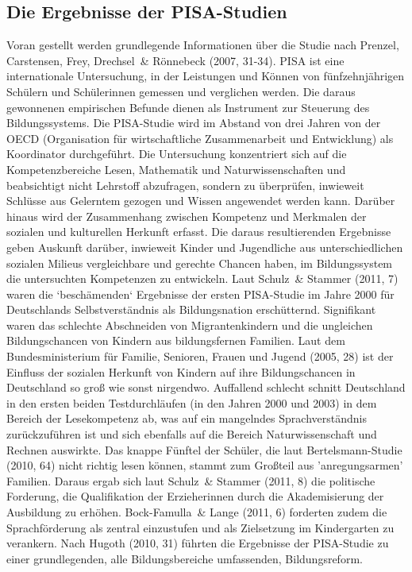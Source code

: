 \subsection{Die Ergebnisse der PISA-Studien}
Voran gestellt werden grundlegende Informationen über die Studie nach Prenzel, Carstensen, Frey, Drechsel~\& Rönnebeck (2007, 31-34). PISA ist eine internationale Untersuchung, in der Leistungen und Können von fünfzehnjährigen Schülern und Schülerinnen gemessen und verglichen werden. Die daraus gewonnenen empirischen Befunde dienen als Instrument zur Steuerung des Bildungssystems. Die PISA-Studie wird im Abstand von drei Jahren von der OECD (Organisation für wirtschaftliche Zusammenarbeit und Entwicklung) als Koordinator durchgeführt. Die Untersuchung konzentriert sich auf die Kompetenzbereiche Lesen, Mathematik und Naturwissenschaften und beabsichtigt nicht Lehrstoff abzufragen, sondern zu überprüfen, inwieweit Schlüsse aus Gelerntem gezogen und Wissen angewendet werden kann. Darüber hinaus wird der Zusammenhang zwischen Kompetenz und Merkmalen der sozialen und kulturellen Herkunft erfasst. Die daraus resultierenden Ergebnisse geben Auskunft darüber, inwieweit Kinder und Jugendliche aus unterschiedlichen sozialen Milieus vergleichbare und gerechte Chancen haben, im Bildungssystem die untersuchten Kompetenzen zu entwickeln. 
Laut Schulz~\& Stammer (2011, 7) waren die ‘beschämenden‘ Ergebnisse der ersten PISA-Studie im Jahre 2000 für Deutschlands Selbstverständnis als Bildungsnation erschütternd. Signifikant waren das schlechte Abschneiden von Migrantenkindern und die ungleichen Bildungschancen von Kindern aus bildungsfernen Familien. Laut dem Bundesministerium für Familie, Senioren, Frauen und Jugend (2005, 28) ist der Einfluss der sozialen Herkunft von Kindern auf ihre Bildungschancen in Deutschland so groß wie sonst nirgendwo. Auffallend schlecht schnitt Deutschland in den ersten beiden Testdurchläufen (in den Jahren 2000 und 2003) in dem Bereich der Lesekompetenz ab, was auf ein mangelndes Sprachverständnis zurückzuführen ist und sich ebenfalls auf die Bereich Naturwissenschaft und Rechnen auswirkte. Das knappe Fünftel der Schüler, die laut Bertelsmann-Studie (2010, 64) nicht richtig lesen können, stammt zum Großteil aus 'anregungsarmen' Familien. 
Daraus ergab sich laut Schulz~\& Stammer (2011, 8) die politische Forderung, die Qualifikation der Erzieherinnen durch die Akademisierung der Ausbildung zu erhöhen. Bock-Famulla~\& Lange (2011, 6) forderten zudem die Sprachförderung als zentral einzustufen und als Zielsetzung im Kindergarten zu verankern. Nach Hugoth (2010, 31) führten die Ergebnisse der PISA-Studie zu einer grundlegenden, alle Bildungsbereiche umfassenden, Bildungsreform.
 
